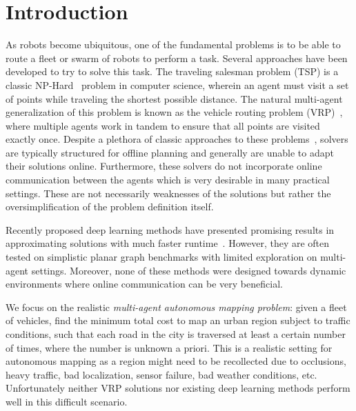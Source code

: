 \section{Introduction}
\label{intro}


As robots become ubiquitous, one of the fundamental problems is to be able to route a fleet or swarm
of robots to perform a task. Several approaches have been developed to try to solve this task.
The traveling salesman problem (TSP) is a classic NP-Hard~\cite{vrp} problem in computer science, wherein 
an agent must visit a set of points while traveling the shortest possible distance.
The natural multi-agent generalization of this problem is known as the vehicle routing
problem (VRP)~\cite{vrp}, where multiple agents work in tandem to ensure that all points are visited exactly once.
Despite a plethora of classic
approaches to these problems~\cite{concorde,lkh3}, solvers are typically structured for offline
planning and generally are unable to adapt their solutions online. Furthermore, these solvers do not
incorporate  online communication between the agents which is very desirable in many
practical settings. These are not necessarily weaknesses of the solutions but rather the
oversimplification of the problem definition itself.

Recently proposed deep learning methods have presented promising results in approximating solutions
with much faster runtime~\cite{pointer,combinatorialgraph,am,ean}. However, they are often tested on
simplistic planar graph benchmarks with limited exploration on multi-agent settings. Moreover, none
of these methods were designed towards dynamic environments where online communication can be very
beneficial.


We focus on the realistic {\it multi-agent autonomous mapping problem}: given a fleet
of vehicles, find the minimum total cost to map an urban region subject to traffic conditions,
such that each road in the city is traversed at least a certain number of times, where the number is
unknown a priori. This is a realistic setting for autonomous mapping as a region might need to be
recollected due to  occlusions, heavy traffic, bad localization, sensor failure, bad weather
conditions, etc. Unfortunately neither VRP solutions nor existing deep learning methods perform well
in this difficult scenario.

